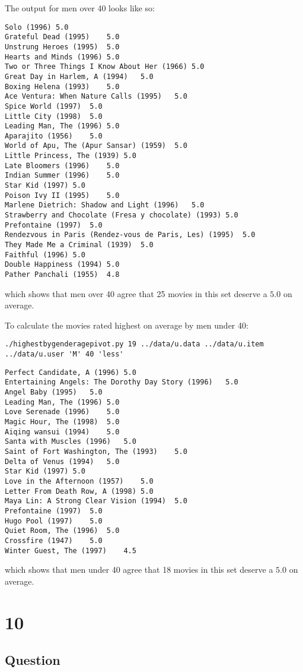 \documentclass[letterpaper,11pt]{article}
\begin{document}
The output for men over 40 looks like so:
\begin{lstlisting}
Solo (1996)	5.0
Grateful Dead (1995)	5.0
Unstrung Heroes (1995)	5.0
Hearts and Minds (1996)	5.0
Two or Three Things I Know About Her (1966)	5.0
Great Day in Harlem, A (1994)	5.0
Boxing Helena (1993)	5.0
Ace Ventura: When Nature Calls (1995)	5.0
Spice World (1997)	5.0
Little City (1998)	5.0
Leading Man, The (1996)	5.0
Aparajito (1956)	5.0
World of Apu, The (Apur Sansar) (1959)	5.0
Little Princess, The (1939)	5.0
Late Bloomers (1996)	5.0
Indian Summer (1996)	5.0
Star Kid (1997)	5.0
Poison Ivy II (1995)	5.0
Marlene Dietrich: Shadow and Light (1996) 	5.0
Strawberry and Chocolate (Fresa y chocolate) (1993)	5.0
Prefontaine (1997)	5.0
Rendezvous in Paris (Rendez-vous de Paris, Les) (1995)	5.0
They Made Me a Criminal (1939)	5.0
Faithful (1996)	5.0
Double Happiness (1994)	5.0
Pather Panchali (1955)	4.8
\end{lstlisting}
which shows that men over 40 agree that 25 movies in this set deserve a $5.0$ on average.

To calculate the movies rated highest on average by men under 40:
\begin{lstlisting}[frame=single]
./highestbygenderagepivot.py 19 ../data/u.data ../data/u.item ../data/u.user 'M' 40 'less'
\end{lstlisting}

\begin{lstlisting}[frame=single]
Perfect Candidate, A (1996)	5.0
Entertaining Angels: The Dorothy Day Story (1996)	5.0
Angel Baby (1995)	5.0
Leading Man, The (1996)	5.0
Love Serenade (1996)	5.0
Magic Hour, The (1998)	5.0
Aiqing wansui (1994)	5.0
Santa with Muscles (1996)	5.0
Saint of Fort Washington, The (1993)	5.0
Delta of Venus (1994)	5.0
Star Kid (1997)	5.0
Love in the Afternoon (1957)	5.0
Letter From Death Row, A (1998)	5.0
Maya Lin: A Strong Clear Vision (1994)	5.0
Prefontaine (1997)	5.0
Hugo Pool (1997)	5.0
Quiet Room, The (1996)	5.0
Crossfire (1947)	5.0
Winter Guest, The (1997)	4.5
\end{lstlisting}
which shows that men under 40 agree that 18 movies in this set deserve a $5.0$ on average.


\newpage

\section*{10}

\subsection*{Question}
\end{document}
